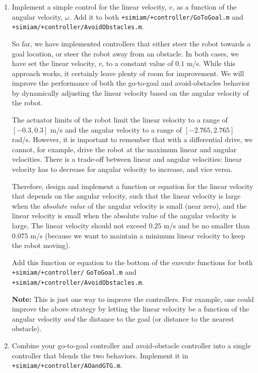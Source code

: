 \documentclass[10pt]{article}
\begin{document}
\begin{enumerate}
  \item Implement a simple control for the linear velocity, $v$, as a function of the angular velocity, $\omega$. Add it to both \texttt{+simiam/+controller/GoToGoal.m} and \texttt{+simiam/+controller/AvoidObstacles.m}.
  
  So far, we have implemented controllers that either steer the robot towards a goal location, or steer the robot away from an obstacle. In both cases, we have set the linear velocity, $v$, to a constant value of $0.1$ m/s. While this approach works, it certainly leave plenty of room for improvement. We will improve the performance of both the go-to-goal and avoid-obstacles behavior by dynamically adjusting the linear velocity based on the angular velocity of the robot.
  
  The actuator limits of the robot limit the linear velocity to a range of $[-0.3,0.3]$ m/s and the angular velocity to a range of $[-2.765,2.765]$ rad/s. However, it is important to remember that with a differential drive, we cannot, for example, drive the robot at the maximum linear and angular velocities. There is a trade-off between linear and angular velocities: linear velocity has to decrease for angular velocity to increase, and vice versa.
  
  Therefore, design and implement a function or equation for the linear velocity that depends on the angular velocity, such that the linear velocity is large when the \textit{absolute value} of the angular velocity is small (near zero), and the linear velocity is small when the absolute value of the angular velocity is large. The linear velocity should not exceed $0.25$ m/s and be no smaller than $0.075$ m/s (because we want to maintain a minimum linear velocity to keep the robot moving).
  
  Add this function or equation to the bottom of the execute functions for both \texttt{+simiam/+controller/} \texttt{GoToGoal.m} and \texttt{+simiam/+controller/AvoidObstacles.m}.
  
  \textbf{Note:} This is just one way to improve the controllers. For example, one could improve the above strategy by letting the linear velocity be a function of the angular velocity \textit{and} the distance to the goal (or distance to the nearest obstacle).
  
  \item Combine your go-to-goal controller and avoid-obstacle controller into a single controller that blends the two behaviors. Implement it in \texttt{+simiam/+controller/AOandGTG.m}.
  

\end{enumerate}
\end{document}
